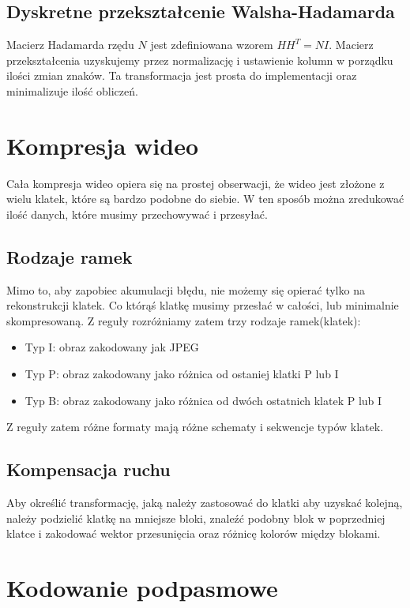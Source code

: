 \documentclass{../notatki}
\begin{document}
\subsection{Dyskretne przekształcenie Walsha-Hadamarda}

Macierz Hadamarda rzędu $N$ jest zdefiniowana wzorem $HH^T = NI$. Macierz
przekształcenia uzyskujemy przez normalizację i ustawienie kolumn w porządku
ilości zmian znaków. Ta transformacja jest prosta do implementacji oraz
minimalizuje ilość obliczeń.

\section{Kompresja wideo}

Cała kompresja wideo opiera się na prostej obserwacji, że wideo jest
złożone z wielu klatek, które są bardzo podobne do siebie. W ten sposób
można zredukować ilość danych, które musimy przechowywać i przesyłać.

\subsection{Rodzaje ramek}

Mimo to, aby zapobiec akumulacji błędu, nie możemy się opierać tylko na
rekonstrukcji klatek. Co którąś klatkę musimy przesłać w całości, lub
minimalnie skompresowaną. Z reguły rozróżniamy zatem trzy rodzaje ramek(klatek):
\begin{itemize}
\item Typ I: obraz zakodowany jak JPEG
\item Typ P: obraz zakodowany jako różnica od ostaniej klatki P lub I
\item Typ B: obraz zakodowany jako różnica od dwóch ostatnich klatek P lub I
\end{itemize}
Z reguły zatem różne formaty mają różne schematy i sekwencje typów klatek.

\subsection{Kompensacja ruchu}

Aby określić transformację, jaką należy zastosować do klatki aby
uzyskać kolejną,
należy podzielić klatkę na mniejsze bloki, znaleźć podobny blok w poprzedniej
klatce i zakodować wektor przesunięcia oraz różnicę kolorów między blokami.

\section{Kodowanie podpasmowe}
\end{document}

